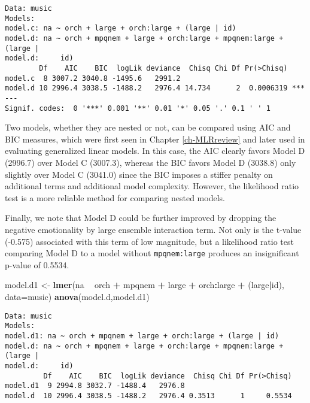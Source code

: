 \documentclass[
]{krantz}
\newenvironment{Shaded}{\begin{snugshade}}{\end{snugshade}}
\newcommand{\DataTypeTok}[1]{\textcolor[rgb]{0.27,0.27,0.27}{#1}}
\newcommand{\KeywordTok}[1]{\textcolor[rgb]{0.27,0.27,0.27}{\textbf{#1}}}
\newcommand{\NormalTok}[1]{#1}
\newcommand{\OperatorTok}[1]{\textcolor[rgb]{0.43,0.43,0.43}{\textbf{#1}}}
\newcommand{\StringTok}[1]{\textcolor[rgb]{0.5,0.5,0.5}{#1}}
\begin{document}
\begin{verbatim}
Data: music
Models:
model.c: na ~ orch + large + orch:large + (large | id)
model.d: na ~ orch + mpqnem + large + orch:large + mpqnem:large + (large | 
model.d:     id)
        Df    AIC    BIC  logLik deviance  Chisq Chi Df Pr(>Chisq)    
model.c  8 3007.2 3040.8 -1495.6   2991.2                             
model.d 10 2996.4 3038.5 -1488.2   2976.4 14.734      2  0.0006319 ***
---
Signif. codes:  0 '***' 0.001 '**' 0.01 '*' 0.05 '.' 0.1 ' ' 1
\end{verbatim}

Two models, whether they are nested or not, can be compared using AIC and BIC measures, which were first seen in Chapter \ref{ch-MLRreview} and later used in evaluating generalized linear models. In this case, the AIC clearly favors Model D (2996.7) over Model C (3007.3), whereas the BIC favors Model D (3038.8) only slightly over Model C (3041.0) since the BIC imposes a stiffer penalty on additional terms and additional model complexity. However, the likelihood ratio test is a more reliable method for comparing nested models.

Finally, we note that Model D could be further improved by dropping the negative emotionality by large ensemble interaction term. Not only is the t-value (-0.575) associated with this term of low magnitude, but a likelihood ratio test comparing Model D to a model without \texttt{mpqnem:large} produces an insignificant p-value of 0.5534.

\begin{Shaded}
\begin{Highlighting}[]
\NormalTok{model.d1 <-}\StringTok{ }\KeywordTok{lmer}\NormalTok{(na }\OperatorTok{~}\StringTok{ }\NormalTok{orch }\OperatorTok{+}\StringTok{ }\NormalTok{mpqnem }\OperatorTok{+}\StringTok{ }\NormalTok{large }\OperatorTok{+}\StringTok{ }\NormalTok{orch}\OperatorTok{:}\NormalTok{large }\OperatorTok{+}\StringTok{ }
\StringTok{  }\NormalTok{(large}\OperatorTok{|}\NormalTok{id), }\DataTypeTok{data=}\NormalTok{music)}
\KeywordTok{anova}\NormalTok{(model.d,model.d1)}
\end{Highlighting}
\end{Shaded}

\begin{verbatim}
Data: music
Models:
model.d1: na ~ orch + mpqnem + large + orch:large + (large | id)
model.d: na ~ orch + mpqnem + large + orch:large + mpqnem:large + (large | 
model.d:     id)
         Df    AIC    BIC  logLik deviance  Chisq Chi Df Pr(>Chisq)
model.d1  9 2994.8 3032.7 -1488.4   2976.8                         
model.d  10 2996.4 3038.5 -1488.2   2976.4 0.3513      1     0.5534
\end{verbatim}
\end{document}
